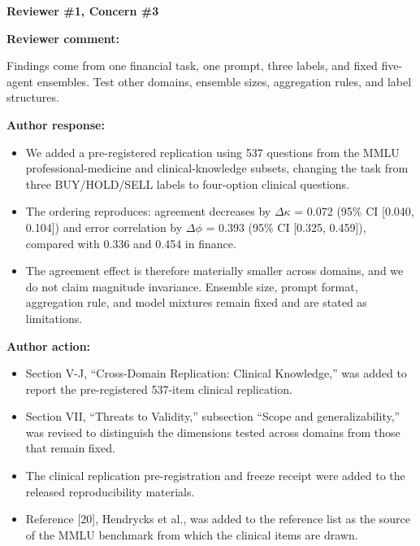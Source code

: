 \documentclass[11pt]{article}
\newcommand{\rvcomment}[1]{{\color{ReviewerGreen}#1}}
\newcommand{\concern}[1]{\textbf{\color{ReviewerGreen}#1}}
\begin{document}
\vspace{12pt}
\concern{Reviewer \#1, Concern \#3}

\concern{Reviewer comment:}

\rvcomment{Findings come from one financial task, one prompt, three labels, and fixed five-agent ensembles. Test other domains, ensemble sizes, aggregation rules, and label structures.}

\textbf{Author response:}

\begin{itemize}

\item We added a pre-registered replication using 537 questions from the MMLU professional-medicine and clinical-knowledge subsets, changing the task from three BUY/HOLD/SELL labels to four-option clinical questions.

\item The ordering reproduces: agreement decreases by $\Delta$$\kappa$ = 0.072 (95\% CI [0.040, 0.104]) and error correlation by $\Delta$$\phi$ = 0.393 (95\% CI [0.325, 0.459]), compared with 0.336 and 0.454 in finance.

\item The agreement effect is therefore materially smaller across domains, and we do not claim magnitude invariance. Ensemble size, prompt format, aggregation rule, and model mixtures remain fixed and are stated as limitations.

\end{itemize}

\textbf{Author action:}

\begin{itemize}

\item Section V-J, ``Cross-Domain Replication: Clinical Knowledge,'' was added to report the pre-registered 537-item clinical replication.

\item Section VII, ``Threats to Validity,'' subsection ``Scope and generalizability,'' was revised to distinguish the dimensions tested across domains from those that remain fixed.

\item The clinical replication pre-registration and freeze receipt were added to the released reproducibility materials.

\item Reference [20], Hendrycks et al., was added to the reference list as the source of the MMLU benchmark from which the clinical items are drawn.

\end{itemize}
\end{document}

